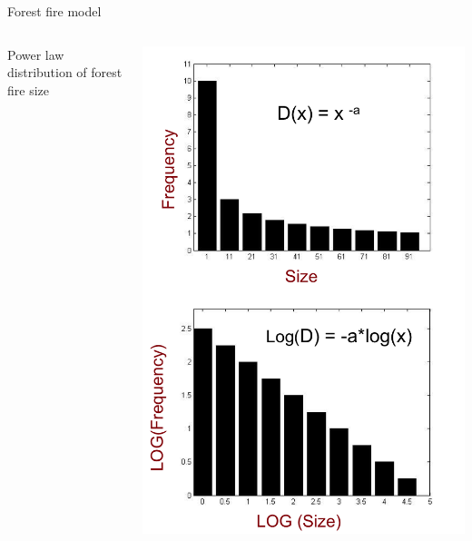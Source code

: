 \documentclass{eecslides}
\begin{document}

	\begin{frame}{Forest fire model}

		\begin{columns}
			\begin{column}{0.5\textwidth}
				Power law distribution of forest fire size
			\end{column}
			\begin{column}{0.5\textwidth}
				\begin{center}
					\includegraphics[height=0.7\textheight]{power_law}
				\end{center}
			\end{column}
		\end{columns}	 
	\end{frame}
\end{document}
